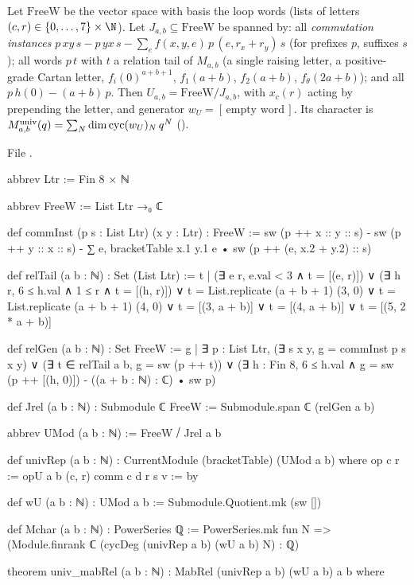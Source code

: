 \begin{definition}\label{l26:def:umod}
Let $\mathrm{FreeW}$ be the vector space with basis the loop words (lists of letters $(c,r)\in\{0,\dots,7\}\times\N$).
Let $J_{a,b}\subseteq\mathrm{FreeW}$ be spanned by: all \emph{commutation instances}
$p\,xy\,s-p\,yx\,s-\sum_ef(x,y,e)\,p\,(e,r_x+r_y)\,s$ (for prefixes $p$, suffixes $s$); all words $p\,t$ with $t$ a
relation tail of $M_{a,b}$ (a single raising letter, a positive-grade Cartan letter, $f_i(0)^{a+b+1}$, $f_1(a+b)$,
$f_2(a+b)$, $f_\theta(2a+b)$); and all $p\,h(0)-(a+b)\,p$. Then $U_{a,b}=\mathrm{FreeW}/J_{a,b}$, with $x_c(r)$
acting by prepending the letter, and generator $w_U=[\,\text{empty word}\,]$. Its character is
$M_{a,b}^{\mathrm{univ}}(q)=\sum_N\dim\operatorname{cyc}(w_U)_N\,q^N$ ().
\end{definition}
\noindent File .
\begin{leancode}
abbrev Ltr := Fin 8 × ℕ

abbrev FreeW := List Ltr →₀ ℂ

def commInst (p s : List Ltr) (x y : Ltr) : FreeW :=
  sw (p ++ x :: y :: s) - sw (p ++ y :: x :: s) -
    ∑ e, bracketTable x.1 y.1 e • sw (p ++ (e, x.2 + y.2) :: s)

def relTail (a b : ℕ) : Set (List Ltr) :=
  {t | (∃ e r, e.val < 3 ∧ t = [(e, r)]) ∨ (∃ h r, 6 ≤ h.val ∧ 1 ≤ r ∧ t = [(h, r)]) ∨
    t = List.replicate (a + b + 1) (3, 0) ∨ t = List.replicate (a + b + 1) (4, 0) ∨
    t = [(3, a + b)] ∨ t = [(4, a + b)] ∨ t = [(5, 2 * a + b)]}

def relGen (a b : ℕ) : Set FreeW :=
  {g | ∃ p : List Ltr, (∃ s x y, g = commInst p s x y) ∨ (∃ t ∈ relTail a b, g = sw (p ++ t)) ∨
    (∃ h : Fin 8, 6 ≤ h.val ∧ g = sw (p ++ [(h, 0)]) - ((a + b : ℕ) : ℂ) • sw p)}

def Jrel (a b : ℕ) : Submodule ℂ FreeW := Submodule.span ℂ (relGen a b)

abbrev UMod (a b : ℕ) := FreeW ⧸ Jrel a b

def univRep (a b : ℕ) : CurrentModule (bracketTable) (UMod a b) where
  op c r := opU a b (c, r)
  comm c d r s v := by

def wU (a b : ℕ) : UMod a b := Submodule.Quotient.mk (sw [])

def Mchar (a b : ℕ) : PowerSeries ℚ :=
  PowerSeries.mk fun N => (Module.finrank ℂ (cycDeg (univRep a b) (wU a b) N) : ℚ)
\end{leancode}
\begin{leancode}
theorem univ_mabRel (a b : ℕ) : MabRel (univRep a b) (wU a b) a b where
\end{leancode}

